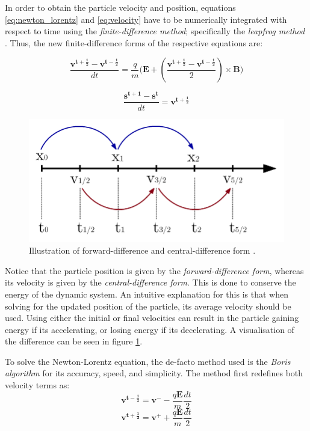 In order to obtain the particle velocity and position, equations \ref{eq:newton_lorentz} and \ref{eq:velocity} have to be numerically integrated with respect to time using the \textit{finite-difference method}; specifically the \textit{leapfrog method} \cite{Hockney1988}. Thus, the new finite-difference forms of the respective equations are:

\begin{equation}
	\frac{\bm{v^{t + \frac{1}{2}}} - \bm{v^{t - \frac{1}{2}}}}{dt} = \frac{q}{m}(\bm{E} + (\frac{\bm{v^{t + \frac{1}{2}}} - \bm{v^{t - \frac{1}{2}}}}{2}) \times \bm{B)}
	\label{eq:newton_lorentz_finite_difference}
\end{equation}

\begin{equation}
	\frac{\bm{s^{t + 1}} - \bm{s^t}}{dt} = \bm{v^{t + \frac{1}{2}}}
	\label{eq:velocity_finite_difference}
\end{equation}

\begin{figure}[h!]
	\centering
	\includegraphics[width=0.6\linewidth]{particle_in_cell/figures/leap_frog.png}
	\caption{Illustration of forward-difference and central-difference form \cite{gisbert_piovella_2020}.}
	\label{fig:leap_frog}
\end{figure} 

Notice that the particle position is given by the \textit{forward-difference form}, whereas its velocity is given by the \textit{central-difference form}. This is done to conserve the energy of the dynamic system. An intuitive explanation for this is that when solving for the updated position of the particle, its average velocity should be used. Using either the initial or final velocities can result in the particle gaining energy if its accelerating, or losing energy if its decelerating. A visualisation of the difference can be seen in figure \ref{fig:leap_frog}. 

To solve the Newton-Lorentz equation, the de-facto method used is the \textit{Boris algorithm} \cite{Birdsall2004} for its accuracy, speed, and simplicity. The method first redefines both velocity terms as:
\begin{equation}
	\bm{v^{t - \frac{1}{2}}} = \bm{v^-} - \frac{q\bm{E}}{m}\frac{dt}{2}
	\label{eq:boris_electric_1}
\end{equation}
\begin{equation}
	\bm{v^{t + \frac{1}{2}}} = \bm{v^+} + \frac{q\bm{E}}{m}\frac{dt}{2}
	\label{eq:boris_electric_2}
\end{equation}

